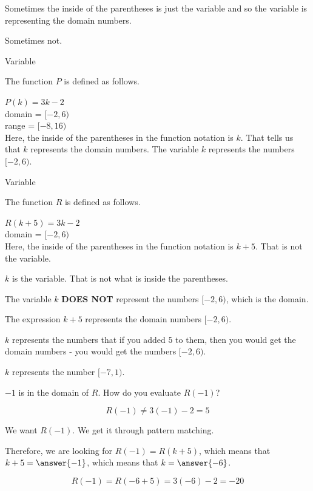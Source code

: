 \documentclass{ximera}
\begin{document}
Sometimes the inside of the parentheses is just the variable and so the variable is representing the domain numbers. 

Sometimes not. 


\begin{example} Variable

The function $P$ is defined as follows.

$P(k) = 3k - 2$ \\
domain = $[-2, 6)$ \\
range = $[-8, 16)$ \\


Here, the inside of the parentheses in the function notation is $k$.  That tells us that $k$ represents the domain numbers.  The variable $k$ represents the numbers $[-2, 6)$.


\end{example}






\begin{example} Variable

The function $R$ is defined as follows.

$R(k + 5) = 3k - 2$ \\
domain = $[-2, 6)$ \\


Here, the inside of the parentheses in the function notation is $k + 5$.  That is not the variable. 


$k$ is the variable.  That is not what is inside the parentheses.


The variable $k$ \textbf{DOES NOT} represent the numbers $[-2, 6)$, which is the domain. 


The expression $k + 5$ represents the domain numbers $[-2, 6)$. 


$k$ represents the numbers that if you added $5$ to them, then you would get the domain numbers - you would get the numbers $[-2, 6)$.


$k$ represents the number $[-7, 1)$.



\begin{question} 


$-1$ is in the domain of $R$. How do you evaluate $R(-1)$? 

\[
R(-1) \ne 3 (-1) - 2 = 5
\]



We want $R(-1)$. We get it through pattern matching.



Therefore, we are looking for $R(-1) = R(k + 5)$, which means that $k + 5 = \answer{-1}$, which means that $k = \answer{-6}$.


\[
R(-1) = R(-6 + 5) = 3(-6) - 2 = -20
\]



\end{question}

\end{example}
\end{document}
